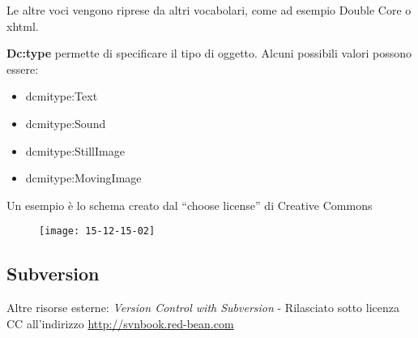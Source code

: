 Le altre voci vengono riprese da altri vocabolari, come ad esempio Double Core o xhtml.

\textbf{Dc:type} permette di specificare il tipo di oggetto. Alcuni possibili valori possono essere:
\begin{itemize}

\item dcmitype:Text
\item dcmitype:Sound
\item dcmitype:StillImage
\item dcmitype:MovingImage
  
\end{itemize}

Un esempio \`e lo schema creato dal ``choose license'' di Creative Commons

\begin{figure}[h]
  \centering
  \texttt{[image: 15-12-15-02]}
\end{figure}

\subsection{Subversion}

Altre risorse esterne: \textit{Version Control with Subversion} - Rilasciato sotto licenza CC all'indirizzo \url{http://svnbook.red-bean.com}

